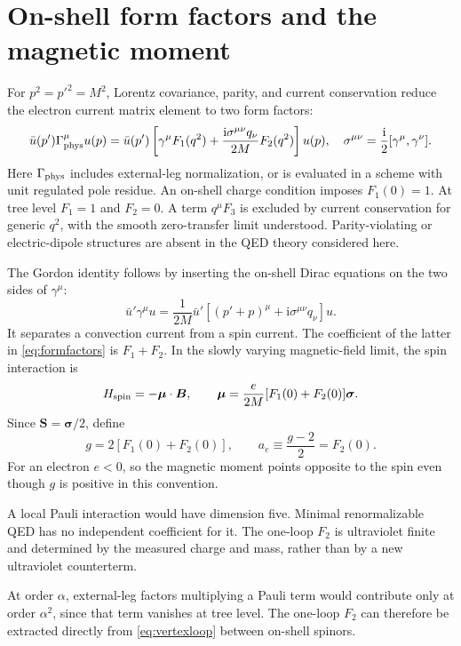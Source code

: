 \documentclass[11pt]{article}
\newcommand{\ii}{\mathrm i}
\newcommand{\module}[1]{\clearpage\section{#1}}
\begin{document}
\module{On-shell form factors and the magnetic moment}
For \(p^2=p'^2=M^2\), Lorentz covariance, parity, and current conservation
reduce the electron current matrix element to two form factors:
\begin{equation}
 \bar u(p')\Gamma^\mu_{\rm phys}u(p)
 =\bar u(p')\left[\gamma^\mu F_1(q^2)
 +\frac{\ii\sigma^{\mu\nu}q_\nu}{2M}F_2(q^2)\right]u(p),
 \quad \sigma^{\mu\nu}=\frac{\ii}{2}[\gamma^\mu,\gamma^\nu].
 \label{eq:formfactors}
\end{equation}
Here \(\Gamma_{\rm phys}\) includes external-leg normalization, or is
evaluated in a scheme with unit regulated pole residue. An on-shell
charge condition imposes \(F_1(0)=1\). At tree level
\(F_1=1\) and \(F_2=0\).
A term \(q^\mu F_3\) is excluded by current conservation for generic
\(q^2\), with the smooth zero-transfer limit understood. Parity-violating
or electric-dipole structures are absent in the QED theory considered here.

The Gordon identity follows by inserting the on-shell Dirac equations
on the two sides of \(\gamma^\mu\):
\begin{equation}
 \bar u'\gamma^\mu u
 =\frac1{2M}\bar u'[(p'+p)^\mu+\ii\sigma^{\mu\nu}q_\nu]u.
\end{equation}
It separates a convection current from a spin current. The coefficient
of the latter in \eqref{eq:formfactors} is \(F_1+F_2\). In the slowly
varying magnetic-field limit, the spin interaction is
\begin{equation}
 H_{\rm spin}=-\bm\mu\cdot\bm B,\qquad
 \bm\mu=\frac{e}{2M}[F_1(0)+F_2(0)]\bm\sigma.
\end{equation}
Since \(\bm S=\bm\sigma/2\), define
\begin{equation}
 g=2[F_1(0)+F_2(0)],\qquad
 a_e\equiv\frac{g-2}{2}=F_2(0).
\end{equation}
For an electron \(e<0\), so the magnetic moment points opposite to the
spin even though \(g\) is positive in this convention.

\begin{keyidea}
A local Pauli interaction would have dimension five. Minimal
renormalizable QED has no independent coefficient for it. The one-loop
\(F_2\) is ultraviolet finite and determined by the measured charge and
mass, rather than by a new ultraviolet counterterm.
\end{keyidea}
At order \(\alpha\), external-leg factors multiplying a Pauli term would
contribute only at order \(\alpha^2\), since that term vanishes at tree
level. The one-loop \(F_2\) can therefore be extracted directly from
\eqref{eq:vertexloop} between on-shell spinors.
\end{document}
